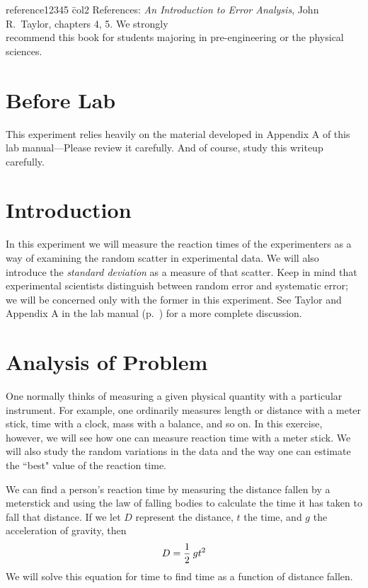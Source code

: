 \newexp

\begin{tabbing}
reference12345 \= col2 \kill
References: \> {\em An Introduction to Error Analysis}, John R.\ Taylor,
   chapters 4, 5.  We strongly \\
\> recommend this book for students majoring in pre-engineering or
the physical \\
\> sciences. \\
\end{tabbing}

\section*{Before Lab}
This experiment relies heavily on the material developed in Appendix A
of this lab manual---Please review it carefully.  And of course, study
this writeup carefully.

\section*{Introduction}
     In this experiment we will measure the reaction times of the
experimenters as a way of examining the random scatter in
experimental data.  We will also introduce the {\em standard deviation}
 as a measure of
that scatter.  Keep in mind that experimental scientists
distinguish between random error and systematic error; we will be
concerned only with the former in this experiment.  See Taylor
and Appendix A in the lab manual (p.~\pageref{scierror})
for a more complete discussion.

\section*{Analysis of Problem}
      One normally thinks of measuring a given physical
quantity with a particular instrument.  For example, one
ordinarily measures length or distance with a meter stick, time
with a clock, mass with a balance, and so on.  In this exercise,
however, we will see how one can measure reaction time with a
meter stick.  We will also study the random variations in the
data and the way one can estimate the ``best" value of the
reaction time.

We can find a person's reaction time by measuring the distance fallen
by a meterstick and using the law of falling bodies to calculate the
time it has taken to fall that distance.  If we let $D$ represent the
distance, $t$ the time, and $g$ the acceleration of gravity, then
\begin{equation}
D = {{1} \over {2}} \: g t^{2}  \label{eq:react1}
\end{equation}
We will solve this equation for time to find time as a function
of distance fallen.

